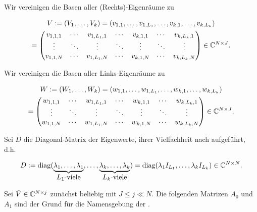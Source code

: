 Wir vereinigen die Basen aller (Rechts)-Eigenräume zu

\begin{multline*}
    V
    :=
    (V_1, \dots, V_k)
    =
    (v_{1, 1}, \dots, v_{1, L_1}, \dots, v_{k, 1}, \dots, v_{k, L_k}) \\
    =
    \begin{pmatrix}
        v_{1, 1, 1} & \cdots & v_{1, L_1, 1} & \cdots & v_{k, 1, 1} & \cdots & v_{k, L_k, 1} \\
        \vdots      & \ddots & \vdots        & \ddots & \vdots      & \ddots & \vdots        \\
        v_{1, 1, N} & \cdots & v_{1, L_1, N} & \cdots & v_{k, 1, N} & \cdots & v_{k, L_k, N}
    \end{pmatrix}
    \in
    \mathbb{C}^{N \times J}.
\end{multline*}

Wir vereinigen die Basen aller Links-Eigenräume zu

\begin{multline*}
    W
    :=
    (W_1, \dots, W_k)
    =
    (w_{1, 1}, \dots, w_{1, L_1}, \dots, w_{k, 1}, \dots, w_{k, L_k}) \\
    =
    \begin{pmatrix}
        w_{1, 1, 1} & \cdots & w_{1, L_1, 1} & \cdots & w_{k, 1, 1} & \cdots & w_{k, L_k, 1} \\
        \vdots      & \ddots & \vdots        & \ddots & \vdots      & \ddots & \vdots        \\
        w_{1, 1, N} & \cdots & w_{1, L_1, N} & \cdots & w_{k, 1, N} & \cdots & w_{k, L_k, N}
    \end{pmatrix}
    \in
    \mathbb{C}^{N \times J}.
\end{multline*}

Sei $D$ die Diagonal-Matrix der Eigenwerte, ihrer Vielfachheit nach aufgeführt, d.h.

\begin{align} \label{eq:diagonal_matrix}
    D
    :=
    \operatorname{diag}
    (
        \underbrace
        {
            \lambda_1, \dots, \lambda_1
        }_{
            \displaystyle
            \text{$L_1$-viele}
        },
        \dots,
        \underbrace
        {
            \lambda_k, \dots, \lambda_k
        }_{
            \displaystyle
            \text{$L_k$-viele}
        }
    )
    =
    \operatorname{diag}(\lambda_1 I_{L_1}, \dots, \lambda_k I_{L_k})
    \in
    \mathbb{C}^{N \times N}.
\end{align}

Sei $\hat V \in \mathbb{C}^{N \times j}$ zunächst beliebig mit $J \leq j \ll N$.
Die folgenden Matrizen $A_0$ und $A_1$ sind der Grund für die Namensgebung der .


